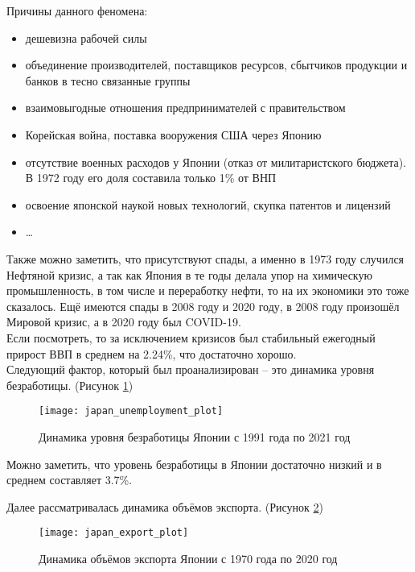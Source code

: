 Причины данного феномена:
\begin{itemize}[topsep=0pt,itemsep=-1ex,partopsep=1ex,parsep=1ex]
	\item дешевизна рабочей силы
	\item объединение производителей, поставщиков ресурсов, сбытчиков продукции и банков в тесно связанные группы
	\item взаимовыгодные отношения предпринимателей с правительством
	\item Корейская война, поставка вооружения США через Японию
	\item отсутствие военных расходов у Японии (отказ от милитаристского бюджета). В 1972 году его доля составила только 1\% от ВНП
	\item освоение японской наукой новых технологий, скупка патентов и лицензий
	\item \dots\\
\end{itemize}

Также можно заметить, что присутствуют спады, а именно в 1973 году случился Нефтяной кризис, а так как Япония в те годы делала упор на химическую промышленность, в том числе и переработку нефти, то на их экономики это тоже сказалось. Ещё имеются спады в 2008 году и 2020 году, в 2008 году произошёл Мировой кризис, а в 2020 году был COVID-19.\\

Если посмотреть, то за исключением кризисов был стабильный ежегодный прирост ВВП в среднем на 2.24\%, что достаточно хорошо.\\

Следующий фактор, который был проанализирован -- это динамика уровня безработицы. (Рисунок \ref{fig:japan_unemployment_plot})

\begin{figure}[h]
	\centering \texttt{[image: japan\_unemployment\_plot]}
	\caption{Динамика уровня безработицы Японии с 1991 года по 2021 год}
	\label{fig:japan_unemployment_plot}
\end{figure}

Можно заметить, что уровень безработицы в Японии достаточно низкий и в среднем составляет 3.7\%.

\newpage

Далее рассматривалась динамика объёмов экспорта. (Рисунок \ref{fig:japan_export_plot})

\begin{figure}[h]
	\centering \texttt{[image: japan\_export\_plot]}
	\caption{Динамика объёмов экспорта Японии с 1970 года по 2020 год}
	\label{fig:japan_export_plot}
\end{figure}

